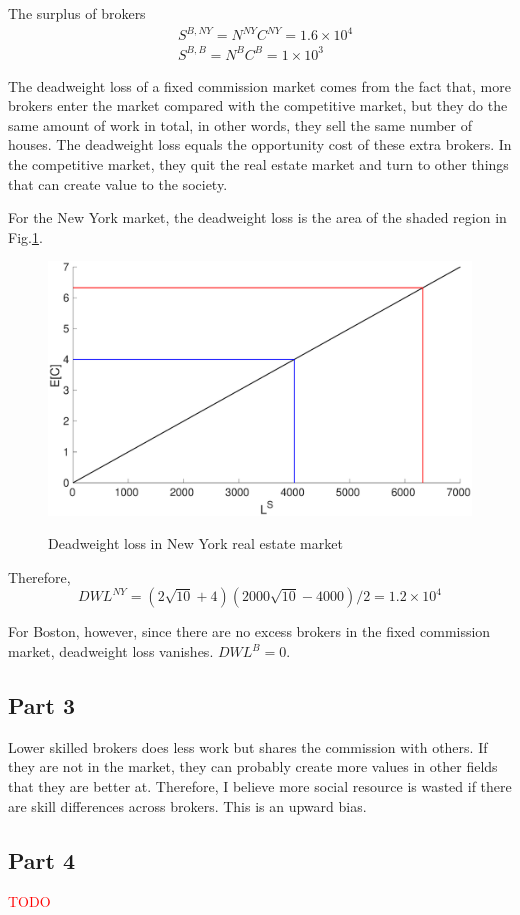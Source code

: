 \documentclass{article}
\begin{document}
The surplus of brokers
\begin{align*}
	&S^{B,NY}=N^{NY}C^{NY}=1.6\times 10^4\\
	&S^{B,B}=N^BC^B=1\times 10^3
\end{align*}

The deadweight loss of a fixed commission market comes from the fact that, more brokers enter the market compared with the competitive market, but they do the same amount of work in total, in other words, they sell the same number of houses. The deadweight loss equals the opportunity cost of these extra brokers. In the competitive market, they quit the real estate market and turn to other things that can create value to the society.

For the New York market, the deadweight loss is the area of the shaded region in Fig.\ref{DWL}.
\begin{figure}[!htbp]
	\centering
	\includegraphics[width=12cm]{figure5.eps}\\
	\caption{Deadweight loss in New York real estate market}
	\label{DWL}
\end{figure}

Therefore,
\begin{equation*}
	DWL^{NY}=(2\sqrt{10}+4)(2000\sqrt{10}-4000)/2=1.2\times 10^4
\end{equation*}

For Boston, however, since there are no excess brokers in the fixed commission market, deadweight loss vanishes. $DWL^B=0$.

\subsection{Part 3}
Lower skilled brokers does less work but shares the commission with others. If they are not in the market, they can probably create more values in other fields that they are better at. Therefore, I believe more social resource is wasted if there are skill differences across brokers. This is an upward bias.

\subsection{Part 4}
\textcolor{red}{TODO}
\end{document}
